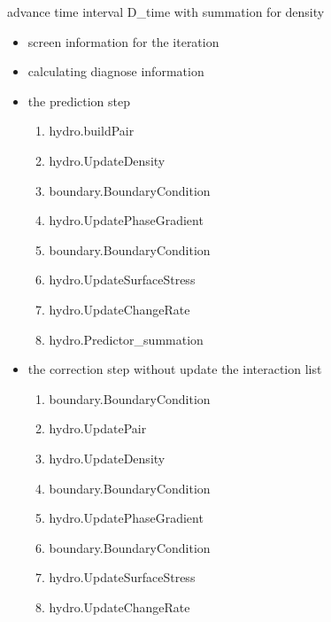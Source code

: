 advance time interval D\_\-time with summation for density 



\begin{itemize}
\item screen information for the iteration

\item calculating diagnose information

\item the prediction step

\begin{enumerate}
\item hydro.buildPair

\item hydro.UpdateDensity

\item boundary.BoundaryCondition

\item hydro.UpdatePhaseGradient

\item boundary.BoundaryCondition

\item hydro.UpdateSurfaceStress

\item hydro.UpdateChangeRate

\item hydro.Predictor\_\-summation\end{enumerate}


\item the correction step without update the interaction list

\begin{enumerate}
\item boundary.BoundaryCondition

\item hydro.UpdatePair

\item hydro.UpdateDensity

\item boundary.BoundaryCondition

\item hydro.UpdatePhaseGradient

\item boundary.BoundaryCondition

\item hydro.UpdateSurfaceStress

\item hydro.UpdateChangeRate


\end{enumerate}
\end{itemize}
